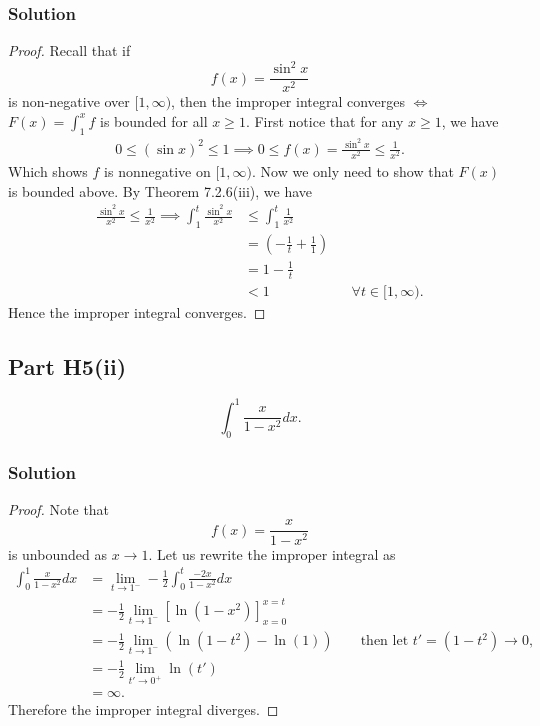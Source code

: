 \documentclass{article}
\theoremstyle{plain}
\begin{document}
\subsubsection*{Solution}
\begin{proof}
  Recall that if \[f(x)=\frac{\sin^{2}x}{x^{2}}\] is non-negative over $[1,\infty)$,
  then the improper integral converges $\iff$ $F(x)=\int_{1}^{x}f$ is bounded for all
  $x\ge 1$. First notice that for any $x\ge1$, we have
  \begin{align*}
    0\le (\sin x)^{2}\le 1 \implies 0\le f(x)=\frac{\sin^{2}x}{x^{2}}\le \frac{1}{x^{2}}.
  \end{align*}
  Which shows $f$ is nonnegative on $[1,\infty)$. Now we only need to show that
  $F(x)$ is bounded above. By Theorem 7.2.6(iii), we have
  \begin{align*}
    \frac{\sin^{2}x}{x^{2}}\le \frac{1}{x^{2}}
    \implies
    \int_{1}^{t}\frac{\sin^{2}x}{x^{2}}&\le \int_{1}^{t}\frac{1}{x^{2}}\\
                                    &= (-\frac{1}{t}+\frac{1}{1})\\
                                    &=1-\frac{1}{t}\\
                                    &<1&&\forall t\in[1,\infty).
  \end{align*}
  Hence the improper integral converges.
\end{proof}
\subsection*{Part H5(ii)}
\[\int_{0}^{1}\frac{x}{1-x^{2}}dx.\]
\subsubsection*{Solution}
\begin{proof}
  Note that
  \[f(x)=\frac{x}{1-x^{2}}\]
  is unbounded as $x\to1$. Let us rewrite the improper integral as
  \begin{align*}
    \int_{0}^{1}\frac{x}{1-x^{2}}dx
    &=\lim_{t\to1^{-}}-\frac{1}{2}\int_{0}^{t}\frac{-2x}{1-x^{2}}dx\\
    &=-\frac{1}{2}\lim_{t\to1^{-}}\left[\ln(1-x^{2})\right]^{x=t}_{x=0}\\
    &=-\frac{1}{2}\lim_{t\to1^{-}}(\ln(1-t^{2})-\ln(1))&&\text{ then let }t'=(1-t^{2})\to0,\\
    &=-\frac{1}{2}\lim_{t'\to0^{+}}\ln(t')\\
    &=\infty.
  \end{align*}
  Therefore the improper integral diverges.
\end{proof}
\end{document}
